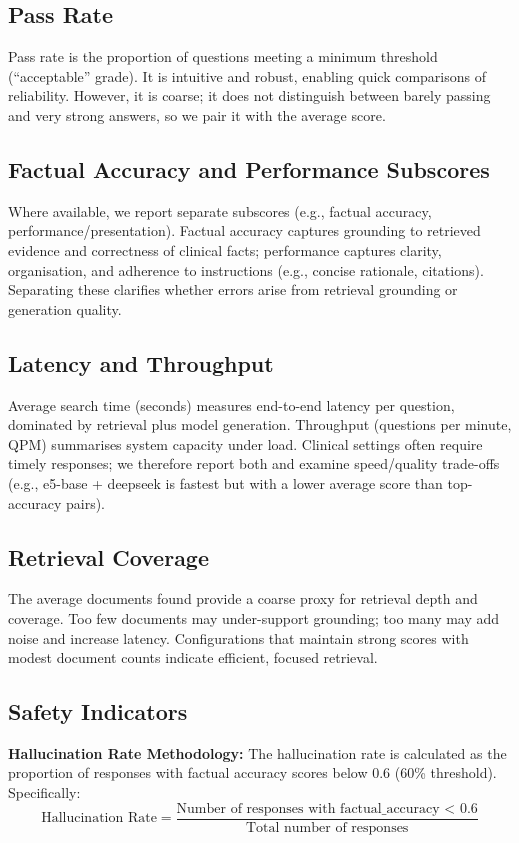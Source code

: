 \subsection{Pass Rate}
Pass rate is the proportion of questions meeting a minimum threshold (``acceptable'' grade). It is intuitive and robust, enabling quick comparisons of reliability. However, it is coarse; it does not distinguish between barely passing and very strong answers, so we pair it with the average score.

\subsection{Factual Accuracy and Performance Subscores}
Where available, we report separate subscores (e.g., factual accuracy, performance/presentation). Factual accuracy captures grounding to retrieved evidence and correctness of clinical facts; performance captures clarity, organisation, and adherence to instructions (e.g., concise rationale, citations). Separating these clarifies whether errors arise from retrieval grounding or generation quality.

\subsection{Latency and Throughput}
Average search time (seconds) measures end-to-end latency per question, dominated by retrieval plus model generation. Throughput (questions per minute, QPM) summarises system capacity under load. Clinical settings often require timely responses; we therefore report both and examine speed/quality trade-offs (e.g., e5-base + deepseek is fastest but with a lower average score than top-accuracy pairs).

\subsection{Retrieval Coverage}
The average documents found provide a coarse proxy for retrieval depth and coverage. Too few documents may under-support grounding; too many may add noise and increase latency. Configurations that maintain strong scores with modest document counts indicate efficient, focused retrieval.

\subsection{Safety Indicators}

\textbf{Hallucination Rate Methodology:}
The hallucination rate is calculated as the proportion of responses with factual accuracy scores below 0.6 (60\% threshold). Specifically:
\begin{equation}
\text{Hallucination Rate} = \frac{\text{Number of responses with factual\_accuracy < 0.6}}{\text{Total number of responses}}
\end{equation}

